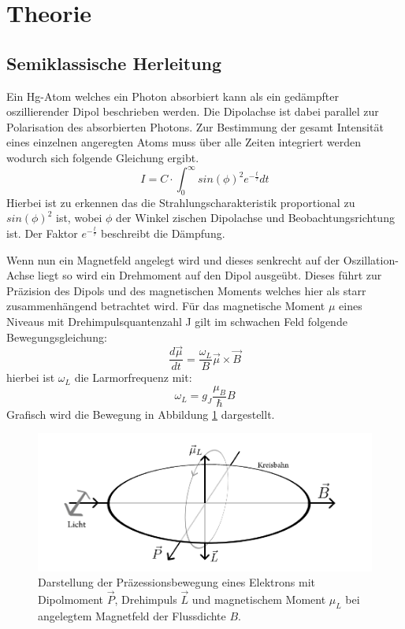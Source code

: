 \section{Theorie}
\subsection{Semiklassische Herleitung}
Ein Hg-Atom welches ein Photon absorbiert kann als ein gedämpfter oszillierender Dipol beschrieben werden. Die Dipolachse ist dabei parallel zur Polarisation des absorbierten Photons. Zur Bestimmung der gesamt Intensität eines einzelnen angeregten Atoms muss über alle Zeiten integriert werden wodurch sich folgende Gleichung ergibt.
\begin{equation}
	I=C\cdot \int_{0}^{\infty}sin(\phi)^2e^{-\frac{t}{\tau}}dt
\end{equation}
Hierbei ist zu erkennen das die Strahlungscharakteristik proportional zu $sin(\phi)^2$ ist, wobei $\phi$ der Winkel zischen Dipolachse und Beobachtungsrichtung ist. Der Faktor $e^{-\frac{t}{\tau}}$ beschreibt die Dämpfung.\par
Wenn nun ein Magnetfeld angelegt wird und dieses senkrecht auf der Oszillation-Achse liegt so wird ein Drehmoment auf den Dipol ausgeübt. Dieses führt zur Präzision des Dipols und des magnetischen Moments welches hier als starr zusammenhängend betrachtet wird. Für das magnetische Moment $\mu$ eines Niveaus mit Drehimpulsquantenzahl J gilt
im schwachen Feld folgende Bewegungsgleichung:
\begin{equation}
\frac{d\vec{\mu}}{dt}=\frac{\omega_L}{B}\vec{\mu}\times\vec{B}
\label{Präzesion}
\end{equation}
hierbei ist $\omega_L$ die Larmorfrequenz mit:
\begin{equation}
	\omega_L=g_J\frac{\mu_B}{\hbar}B
\end{equation}
Grafisch wird die Bewegung in Abbildung \ref{Präzesionsbild} dargestellt.
\begin{figure}[ht]
	\includegraphics[scale=0.8]{Bild/TestP}
	\centering
	\caption[Semiklassische Darstellung des Hanle Effekts]{Darstellung der Präzessionsbewegung eines Elektrons mit Dipolmoment $\vec{P}$, Drehimpuls $\vec{L}$ und magnetischem Moment $\mu_L$ bei angelegtem Magnetfeld der Flussdichte $B$.}
	\label{Präzesionsbild}
\end{figure}\\
